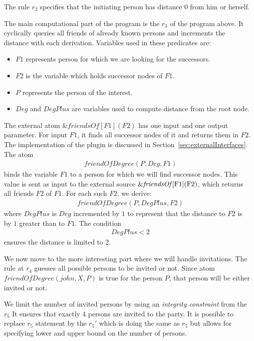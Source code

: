 \documentclass[14pt,a4paper, titlepage]{article}
\newcommand{\ext}[3]{\ensuremath{\&{#1}[#2](#3)}}
\begin{document}
The rule $r_2$ specifies that the initiating person has distance 0 from him or herself. 

The main computational part of the program is the $r_3$ of the program above. It cyclically queries all  friends of already known persons and increments the distance with each derivation. Variables used in these predicates are: 

\begin{itemize}
\item $\mathit{F1}$ represents person for which we are looking for the successors.

\item $\mathit{F2}$ is the variable which holds successor nodes of $F1$. 

\item $P$ represents the person of the interest.

\item $\mathit{Deg}$ and $DegPlus$ are variables used to compute distance from the root node.
\end{itemize}
The external atom \ext{friendsOf}{F1}{F2} has one input and one output parameter. For input $\mathit{F1}$, 
it finds all successor nodes of it and returns them in $\mathit{F2}$. The implementation of the plugin is discussed in Section~\ref{sec:externalInterfaces}. The atom
\begin{align*}
& \mathit{friendOfDegree(P, Deg, F1)}
\end{align*}
binds the variable $\mathit{F1}$ to a person for which we will find successor nodes. This value is sent as input to the external source \ext{\mathit{friendsOf}}{$F1$}{$F2$}, which returns all friends $F2$ of $F1$. For each such $F2$, we derive:
\begin{align*}
& \mathit{friendOfDegree(P, DegPlus, F2)}
\end{align*} 
where $\mathit{DegPlus}$ is $\mathit{Deg}$ incremented by $1$ to represent that the distance to $F2$ is by $1$ greater than to $F1$. The condition
\begin{align*}
& \mathit{DegPlus < 2}
\end{align*}
ensures the distance is limited to 2. 

We now move to the more interesting part where we will handle invitations. The rule at $r_4$ guesses all possible persons to be invited or not. Since atom $\mathit{friendOfDegree(john, X, P)}$ is true for the person $P$, that person will be either invited or not.

We limit the number of invited persons by using an \emph{integrity constraint} from the $r_5$
It ensures that exactly 4 persons are invited to the party. It is possible to replace $r_5$ statement by the $r_5 \prime $
which is doing the same as $r_5$ but allows for specifying lower and upper bound on the number of persons.
  
\end{document}
